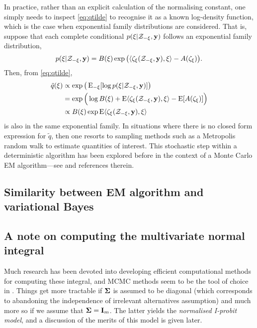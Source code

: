 In practice, rather than an explicit calculation of the normalising constant, one simply needs to inspect \cref{eq:qtilde} to recognise it as a known log-density function, which is the case when exponential family distributions are considered.
That is, suppose that each complete conditional $p(\xi|{\mathcal Z}_{-\xi}, {\mathbf y})$ follows an exponential family distribution,
\[
  p(\xi|{\mathcal Z}_{-\xi}, {\mathbf y}) = B(\xi)\exp \big(\langle\zeta_\xi({\mathcal Z}_{-\xi}, {\mathbf y}) , \xi\rangle - A(\zeta_\xi) \big).
\]
Then, from \cref{eq:qtilde},
\begin{align*}
  \tilde q(\xi)
  &\propto \exp\big(\operatorname{E}_{-\xi}[\log p(\xi|{\mathcal Z}_{-\xi}, {\mathbf y})] \big) \\
  &= \exp \Big(\log B(\xi) + \operatorname{E} \langle\zeta_\xi({\mathcal Z}_{-\xi}, {\mathbf y}) , \xi\rangle - \operatorname{E} [ A(\zeta_\xi) ] \Big) \\
  &\propto B(\xi)\exp \operatorname{E}\langle\zeta_\xi({\mathcal Z}_{-\xi}, {\mathbf y}) , \xi\rangle
\end{align*}
is also in the same exponential family.
In situations where there is no closed form expression for $\tilde q$, then one resorts to sampling methods such as a Metropolis random walk to estimate quantities of interest.
This stochastic step within a deterministic algorithm has been explored before in the context of a Monte Carlo EM algorithm---see \citet[§4, pp. 537--538]{meng1997algorithm} and references therein.

\subsection{Similarity between EM algorithm and variational Bayes}


\subsection{A note on computing the multivariate normal integral}
\label{misc:mnint}


Much research has been devoted into developing efficient computational methods for computing these integral, and MCMC methods seem to be the tool of choice in \citep{mcculloch1994exact,nobile1998hybrid,mcculloch2000bayesian}.
Things get more tractable if ${\bm\Sigma}$ is assumed to be diagonal (which corresponds to abandoning the independence of irrelevant alternatives assumption) and much more so if we assume that ${\bm\Sigma} = {\mathbf I}_m$.
The latter yields the \emph{normalised I-probit model}, and a discussion of the merits of this model is given later.



